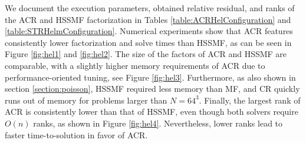 \documentclass[]{elsarticle}
\begin{document}
We document the execution parameters, obtained relative residual, and ranks of the ACR and HSSMF factorization in Tables \ref{table:ACRHelConfiguration} and \ref{table:STRHelmConfiguration}. Numerical experiments show that ACR features consistently lower factorization and solve times than HSSMF, as can be seen in Figure \ref{fig:hel1} and \ref{fig:hel2}. The size of the factors of ACR and HSSMF are comparable, with a slightly higher memory requirements of ACR due to performance-oriented tuning, see Figure \ref{fig:hel3}. Furthermore, as also shown in section \ref{section:poisson}, HSSMF required less memory than MF, and CR quickly runs out of memory for problems larger than $N=64^3$. Finally, the largest rank of ACR is consistently lower than that of HSSMF, even though both solvers require $O(n)$ ranks, as shown in Figure \ref{fig:hel4}. Nevertheless, lower ranks lead to faster time-to-solution in favor of ACR.
\end{document}
